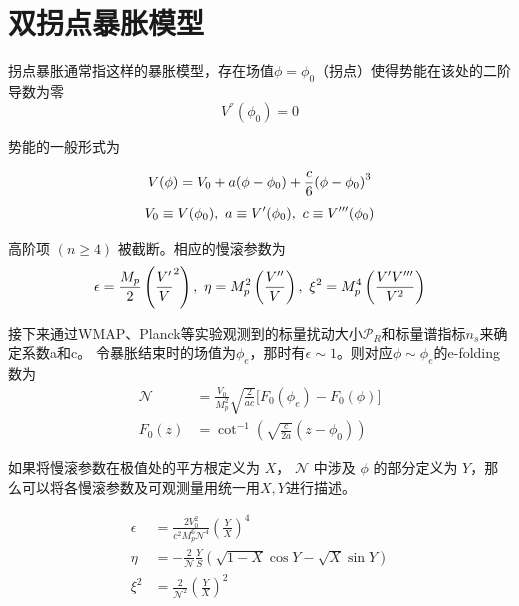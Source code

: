 \section{双拐点暴胀模型}
拐点暴胀通常指这样的暴胀模型，存在场值$\phi=\phi_0$（拐点）使得势能在该处的二阶导数为零
\begin{equation}
    V^{\dprime}(\phi_0) = 0
\end{equation}

势能的一般形式为

\begin{equation}
    \label{eq:inf_potential}
    V (\phi)=V_0+a (\phi-\phi_0)+\frac{c}{6}{\left(\phi-\phi_0\right)}^3\\
\end{equation}
\begin{equation}
    V_0\equiv V (\phi_0),\ a\equiv V' (\phi_0),\ c\equiv V^{\tprime} (\phi_0) 
\end{equation}

高阶项 $(n \geq 4)$ 被截断。相应的慢滚参数为
\begin{equation}
    \label{eq:psrp}
    \epsilon = \frac{M_p}{2}\left(\frac{V'}{V}^2\right),\ \eta=M^2_p
    \left(\frac{V^{\dprime}}{V}\right),\ \xi^2=M^4_p\left(\frac{V'V^{\tprime}}{V^2}\right)
\end{equation}

接下来通过WMAP、Planck等实验观测到的标量扰动大小$\mathcal{P}_R$和标量谱指标$n_s$来确定系数a和c。
令暴胀结束时的场值为$\phi_e$，那时有$\epsilon\sim
1$。则对应$\phi\sim\phi_e$的e-folding数为
\begin{align}
    \label{eq:e-folding}
    \mathcal{N} &= \frac{V_0}{M^2_p}\sqrt{\frac{2}{ac}}\lbrack
    F_0(\phi_e)-F_0(\phi)\rbrack \\
    F_0(z) &= \cot^{-1}\left(\sqrt{\frac{c}{2a}}(z-\phi_0)\right)
\end{align}

如果将慢滚参数在极值处的平方根定义为 $X$， $\mathcal{N}$ 中涉及 $\phi$
的部分定义为 $Y$，那么可以将各慢滚参数及可观测量用统一用$X,Y$进行描述。

\begin{align}
    \epsilon &=
    \frac{2V_0^2}{c^2M_p^6\mathcal{N}^4} {\left(\frac{Y}{X} \right)}^4 \\
    \eta &=
    -\frac{2}{\mathcal{N}}\frac{Y}{S}\left(\sqrt{1-X}\cos Y-\sqrt{X}\sin
    Y\right)\\
    \xi^2 &= \frac{2}{\mathcal{N}^2}{\left(\frac{Y}{X}\right)}^2
\end{align}

